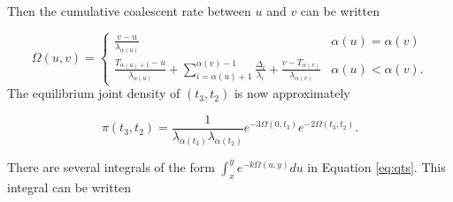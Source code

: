\documentclass{article}
\begin{document}
Then the cumulative coalescent rate between $u$ and $v$ can be written

\begin{equation}
    \Omega(u,v) =
    \begin{cases}
        \frac{v-u}{\lambda_{\alpha(u)}} & \alpha(u) = \alpha(v)\\[1em]
        \frac{T_{\alpha(u)+1}-u}{\lambda_{\alpha(u)}} +
          \sum_{i=\alpha(u)+1}^{\alpha(v)-1}\frac{\Delta_i}{\lambda_i} +
          \frac{v-T_{\alpha(v)}}{\lambda_{\alpha(v)}}
          & \alpha(u) < \alpha(v).
    \end{cases}
\end{equation}
The equilibrium joint density of $(t_3,t_2)$ is now approximately

\begin{equation}
    \pi(t_3,t_2) = \frac{1}{\lambda_{\alpha(t_3)}\lambda_{\alpha(t_2)}}e^{-3\Omega(0,t_3)}e^{-2\Omega(t_3,t_2)}.
    \label{eq:marginal}
\end{equation}

There are several integrals of the form $\int_x^y e^{-k\Omega(u,y)}du$ in
Equation \eqref{eq:qts}. This integral can be written
\end{document}
